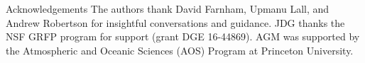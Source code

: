 \begin{block}{Acknowledgements}
  The authors thank David Farnham, Upmanu Lall, and Andrew Robertson for insightful conversations and guidance.
  JDG thanks the NSF GRFP program for support (grant DGE 16-44869).
  AGM was supported by the Atmospheric and Oceanic Sciences (AOS) Program at Princeton University.
\end{block}
